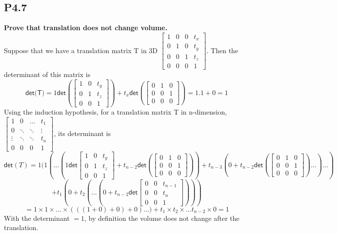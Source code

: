 \documentclass[12pt]{article}
\begin{document}
\subsection*{P4.7}
\textbf{Prove that translation does not change volume.}\\
Suppose that we have a translation matrix T in 3D $\begin{bmatrix}
1 & 0 & 0 & t_x\\
0 & 1 & 0 & t_y\\
0 & 0 & 1 & t_z\\
0 & 0 & 0 & 1
\end{bmatrix}$. Then the determinant of this matrix is 
$$\textsf{det(T)} = 1\textsf{det}(\begin{bmatrix}
1 & 0 & t_y\\
0 & 1 & t_z\\
0 & 0 & 1
\end{bmatrix}) + t_x\textsf{det}(\begin{bmatrix}
0 & 1 & 0 \\
0 & 0 & 1 \\
0 & 0 & 0 
\end{bmatrix}) 
=1.1 + 0 = 1
$$
Using the induction hypothesis, for a translation matrix T in n-dimension, $\begin{bmatrix}
1 & 0 & \ldots & t_1\\
0 & \ddots & \ddots & \vdots\\
\vdots & \ddots & \ddots & t_n\\
0 & 0 & 0 & 1
\end{bmatrix}$, its determinant is
$$\textsf{det}(T)=1(1(\ldots(1\textsf{det}\begin{bmatrix}
1 & 0 & t_y\\
0 & 1 & t_z\\
0 & 0 & 1
\end{bmatrix}+t_{n-2}\textsf{det}(\begin{bmatrix}
0 & 1 & 0\\
0 & 0 & 1\\
0 & 0 & 0
\end{bmatrix})
)+t_{n-3}(0+t_{n-2}\textsf{det}(\begin{bmatrix}
0 & 1 & 0\\
0 & 0 & 1\\
0 & 0 & 0
\end{bmatrix})\ldots)\ldots)$$
$$+t_1(0 + t_2(\ldots(0 + t_{n-2}\textsf{det}\begin{bmatrix}
0 & 0 & t_{n-1}\\
0 & 0 & t_n\\
0 & 0 & 1
\end{bmatrix})))$$
$$=1\times 1\times\ldots\times (((1+0)+0)+0)\ldots) + t_1\times t_2 \times\ldots t_{n-2}\times 0=1$$
With the determinant $=1$, by definition the volume does not change after the translation.
\end{document}
